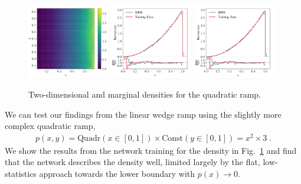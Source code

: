 \begin{figure}[b!]
\centering
\includegraphics[width=0.32\textwidth, page=1]{./figures/bINN/quadratic_2dhists}
\includegraphics[width=0.32\textwidth, page=1]{./figures/bINN/quadratic_1dhists}
\includegraphics[width=0.32\textwidth, page=2]{./figures/bINN//quadratic_1dhists}
\caption{Two-dimensional and marginal densities for the quadratic ramp.}
\label{fig:quadratic_hists}
\end{figure}

We can test our findings from the linear wedge ramp using the slightly
more complex quadratic ramp,
%
\begin{align}
  p(x, y) =  \text{Quadr} (x\in[0,1]) \times \text{Const} (y \in[0, 1])
  = x^2 \times 3 \; .
\label{eq:quadratic_dens}
\end{align}
%
We show the results from the network training for the density in
Fig.~\ref{fig:quadratic_hists} and find that the network describes the
density well, limited largely by the flat, low-statistics approach
towards the lower boundary with $p(x) \to 0$.

